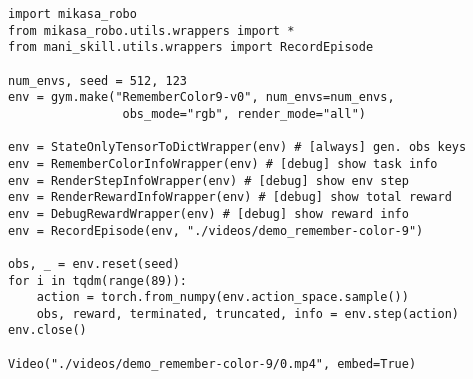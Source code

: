 \begin{lstlisting}[caption={MIKASA-Robo wrappers system.}, label={lst:hello}]
import mikasa_robo
from mikasa_robo.utils.wrappers import *
from mani_skill.utils.wrappers import RecordEpisode

num_envs, seed = 512, 123
env = gym.make("RememberColor9-v0", num_envs=num_envs,
                obs_mode="rgb", render_mode="all")

env = StateOnlyTensorToDictWrapper(env) # [always] gen. obs keys
env = RememberColorInfoWrapper(env) # [debug] show task info
env = RenderStepInfoWrapper(env) # [debug] show env step
env = RenderRewardInfoWrapper(env) # [debug] show total reward
env = DebugRewardWrapper(env) # [debug] show reward info
env = RecordEpisode(env, "./videos/demo_remember-color-9")

obs, _ = env.reset(seed)
for i in tqdm(range(89)):
    action = torch.from_numpy(env.action_space.sample())
    obs, reward, terminated, truncated, info = env.step(action)
env.close()

Video("./videos/demo_remember-color-9/0.mp4", embed=True)

\end{lstlisting}